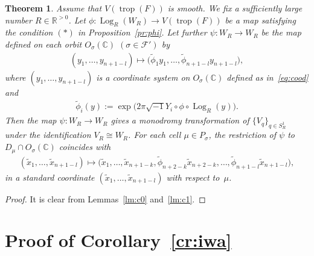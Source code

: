 \documentclass[10pt,a4paper]{amsart}
\numberwithin{equation}{section}
\newtheorem{Theorem}{Theorem}[section]
\begin{document}
\begin{Theorem}\label{th:main} Assume that $V(\operatorname{trop}(F))$ is smooth. We fix a sufficiently large number $R \in {\mathbb R}^{>0}$. Let $\phi \colon \operatorname{Log}_R(W_R) \to V(\operatorname{trop}(F))$ be a map satisfying the condition $(\ast)$ in Proposition~{\rm \ref{pr:phi}}. Let further $\psi \colon W_R \to W_R$ be the map defined on each orbit $O_\sigma({\mathbb C})$ $(\sigma \in {\mathcal F}')$ by
\begin{gather}\label{eq:c4}
(y_1, \dots ,y_{n+1-l}) \mapsto \big(\tilde{\phi}_{1}y_1, \dots, \tilde{\phi}_{n+1-l}y_{n+1-l}\big),
\end{gather}
where $(y_1, \dots ,y_{n+1-l})$ is a coordinate system on $O_\sigma({\mathbb C})$ defined as in~\eqref{eq:cood} and
\begin{gather*}
\tilde{\phi}_{i}(y) := \exp \big(2 \pi \sqrt{-1} Y_i \circ \phi \circ \operatorname{Log}_R (y) \big).
\end{gather*}
Then the map $\psi \colon W_R \to W_R$ gives a monodromy transformation of $\{ V_q \}_{q \in S_R^1}$ under the identification $V_R \cong W_R$.
For each cell $\mu \in P_\sigma$, the restriction of $\psi$ to $D_\mu \cap O_\sigma({\mathbb C})$ coincides with
\begin{gather*}
(\tilde{x}_1, \dots, \tilde{x}_{n+1-l}) \mapsto
\big(\tilde{x}_1, \dots, \tilde{x}_{n+1-k}, \tilde{\phi}_{n+2-k}\tilde{x}_{n+2-k}, \dots, \tilde{\phi}_{n+1-l} \tilde{x}_{n+1-l}\big),
\end{gather*}
in a standard coordinate $(\tilde{x}_1, \dots, \tilde{x}_{n+1-l})$ with respect to~$\mu$.
\end{Theorem}

\begin{proof}
It is clear from Lemmas~\ref{lm:c0} and~\ref{lm:c1}.
\end{proof}


\section{Proof of Corollary~\ref{cr:iwa}}\label{sc:5}
\end{document}
